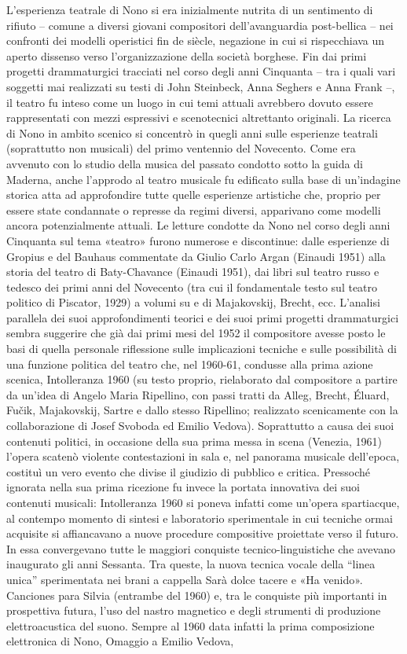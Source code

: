 L’esperienza teatrale di Nono si era inizialmente nutrita di un sentimento di rifiuto – comune a diversi giovani compositori dell’avanguardia post-bellica – nei confronti dei modelli operistici fin de siècle, negazione in cui si rispecchiava un aperto dissenso verso l’organizzazione della società borghese. Fin dai primi progetti drammaturgici tracciati nel corso degli anni Cinquanta – tra i quali vari soggetti mai realizzati su testi di John Steinbeck, Anna Seghers e Anna Frank –, il teatro fu inteso come un luogo in cui temi attuali avrebbero dovuto essere rappresentati con mezzi espressivi e scenotecnici altrettanto originali. La ricerca di Nono in ambito scenico si concentrò in quegli anni sulle esperienze teatrali (soprattutto non musicali) del primo ventennio del Novecento. Come era avvenuto con lo studio della musica del passato condotto sotto la guida di Maderna, anche l’approdo al teatro musicale fu edificato sulla base di un’indagine storica atta ad approfondire tutte quelle esperienze artistiche che, proprio per essere state condannate o represse da regimi diversi, apparivano come modelli ancora potenzialmente attuali. Le letture condotte da Nono nel corso degli anni Cinquanta sul tema «teatro» furono numerose e discontinue: dalle esperienze di Gropius e del Bauhaus commentate da Giulio Carlo Argan (Einaudi 1951) alla storia del teatro di Baty-Chavance (Einaudi 1951), dai libri sul teatro russo e tedesco dei primi anni del Novecento (tra cui il fondamentale testo sul teatro politico di Piscator, 1929) a volumi su e di Majakovskij, Brecht, ecc. L’analisi parallela dei suoi approfondimenti teorici e dei suoi primi progetti drammaturgici sembra suggerire che già dai primi mesi del 1952 il compositore avesse posto le basi di quella personale riflessione sulle implicazioni tecniche e sulle possibilità di una funzione politica del teatro che, nel 1960-61, condusse alla prima azione scenica, Intolleranza 1960 (su testo proprio, rielaborato dal compositore a partire da un’idea di Angelo Maria Ripellino, con passi tratti da Alleg, Brecht, Éluard, Fučik, Majakovskij, Sartre e dallo stesso Ripellino; realizzato scenicamente con la collaborazione di Josef Svoboda ed Emilio Vedova). Soprattutto a causa dei suoi contenuti politici, in occasione della sua prima messa in scena (Venezia, 1961) l’opera scatenò violente contestazioni in sala e, nel panorama musicale dell’epoca, costituì un vero evento che divise il giudizio di pubblico e critica. Pressoché ignorata nella sua prima ricezione fu invece la portata innovativa dei suoi contenuti musicali: Intolleranza 1960 si poneva infatti come un’opera spartiacque, al contempo momento di sintesi e laboratorio sperimentale in cui tecniche ormai acquisite si affiancavano a nuove procedure compositive proiettate verso il futuro. In essa convergevano tutte le maggiori conquiste tecnico-linguistiche che avevano inaugurato gli anni Sessanta. Tra queste, la nuova tecnica vocale della “linea unica” sperimentata nei brani a cappella Sarà dolce tacere e «Ha venido». Canciones para Silvia (entrambe del 1960) e, tra le conquiste più importanti in prospettiva futura, l’uso del nastro magnetico e degli strumenti di produzione elettroacustica del suono. Sempre al 1960 data infatti la prima composizione elettronica di Nono, Omaggio a Emilio Vedova, 